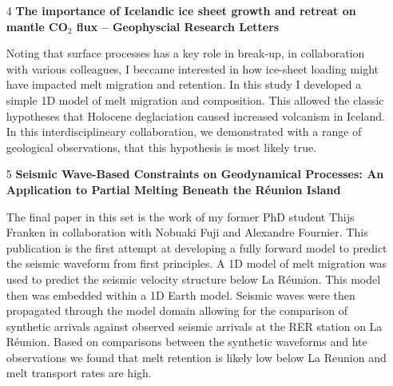 \begin{itemize}
\item[4] {\bf The importance of Icelandic ice sheet growth and retreat on mantle CO$_2$ flux -- Geophyscial Research Letters}

Noting that surface processes has a key role in break-up, in collaboration with various colleagues, I beccame interested in how ice-sheet loading might have impacted melt migration and retention. In this study I developed a simple 1D model of melt migration and composition. This allowed the classic hypotheses that Holocene deglaciation caused increased volcanism in Iceland. In this interdisciplineary collaboration, we demonstrated with a range of geological observations, that this hypothesis is most likely true.

\item[5] {\bf Seismic Wave-Based Constraints on Geodynamical Processes: An Application to Partial Melting Beneath the Réunion Island}

The final paper in this set is the work of my former PhD student Thijs Franken in collaboration with Nobuaki Fuji and Alexandre Fournier. This publication is the first attempt at developing a fully forward model to predict the seismic waveform from first principles. A 1D model of melt migration was used to predict the seismic velocity structure below La Réunion. This model then was embedded within a 1D Earth model. Seismic waves were then propagated through the model domain allowing for the comparison of synthetic arrivals against observed seismic arrivals at the RER station on La Réunion. Based on comparisons between the synthetic waveforms and hte observations we found that melt retention is likely low below La Reunion and melt transport rates are high.

\end{itemize}

